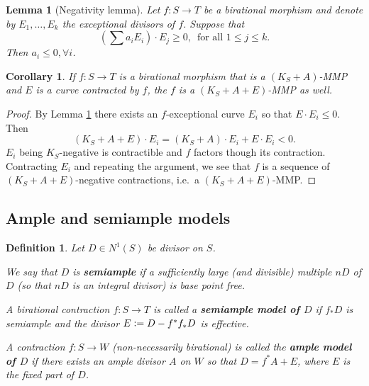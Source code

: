 \documentclass[a4paper,11pt]{amsart}
\newtheorem{corollary}[theorem]{Corollary}
\newtheorem{lemma}[theorem]{Lemma}
\newtheorem{definition}[theorem]{Definition}
\newcommand{\defeq}{\vcentcolon=}
\begin{document}
\begin{lemma}[{Negativity lemma}]\label{lem:negativity}
	Let $f \colon S \to T$ be a birational morphism and denote by $E_1, \dots, E_k$ the exceptional divisors of $f$.	
	Suppose that 
	\[
	\left(\sum a_iE_i\right)\cdot E_j \geq 0, \, \text{ for all $1\leq j \leq k$.}
	\]
	Then $a_i \leq 0, \forall i$.
\end{lemma}

\begin{corollary}
	If $f\colon S \to T$ is a birational morphism that is a $(K_S + A)$-MMP and $E$ is a curve contracted by $f$, the $f$ is a $(K_S + A + E)$-MMP as well.
\end{corollary}

\begin{proof}
	By Lemma \ref{lem:negativity} there exists an $f$-exceptional curve $E_i$ so that $E \cdot E_i \leq 0$.
	Then
	\[
	(K_S + A + E)\cdot E_i = (K_S + A)\cdot E_i + E\cdot E_i < 0.
	\]
	$E_i$ being $K_S$-negative is contractible and $f$ factors though its contraction.
	Contracting $E_i$ and repeating the argument, we see that $f$ is a sequence of  $(K_S + A + E)$-negative contractions, i.e.\ a $(K_S + A + E)$-MMP.
\end{proof}



\subsection{Ample and semiample models}


\begin{definition}\label{def:(semi)ampleModels}
	Let $D \in N^1(S)$ be divisor on $S$.
	
	We say that $D$ is \textbf{semiample} if a sufficiently large (and divisible) multiple $nD$ of $D$ (so that $nD$ is an integral divisor) is base point free.
	
	A \emph{birational} contraction $f \colon S \to T$ is called a \textbf{semiample model of $D$} if $f_*D$ is semiample and the divisor $E \defeq D - f^*f_*D$ is effective.
	
	A contraction $f \colon S \to W$ (non-necessarily birational) is called the \textbf{ample model of $D$} if there exists an ample divisor $A$ on $W$ so that $D = f^*A + E$, where $E$ is the fixed part of $D$.
\end{definition}
\end{document}
